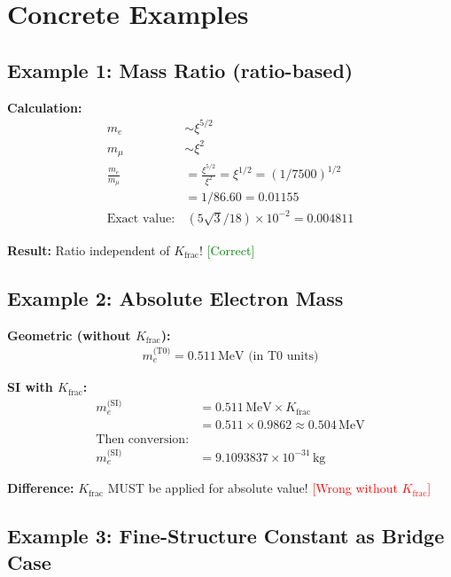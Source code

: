 	\section{Concrete Examples}
	
	\subsection{Example 1: Mass Ratio (ratio-based)}
	
	\textbf{Calculation:}
	\begin{align*}
		m_e &\sim \xi^{5/2} \\
		m_μ &\sim \xi^2 \\
		\frac{m_e}{m_μ} &= \frac{\xi^{5/2}}{\xi^2} = \xi^{1/2} = (1/7500)^{1/2} \\
		&= 1/86.60 = 0.01155 \\
		\text{Exact value:} &\, (5\sqrt{3}/18) \times 10^{-2} = 0.004811
	\end{align*}
	
	\textbf{Result:} Ratio independent of $K_{\text{frac}}$! \textcolor{green}{[Correct]}
	
	\subsection{Example 2: Absolute Electron Mass}
	
	\textbf{Geometric (without $K_{\text{frac}}$):}
	\begin{align*}
		m_e^{\text{(T0)}} = 0.511\,\text{MeV (in T0 units)}
	\end{align*}
	
	\textbf{SI with $K_{\text{frac}}$:}
	\begin{align*}
		m_e^{\text{(SI)}} &= 0.511\,\text{MeV} \times K_{\text{frac}} \\
		&= 0.511 \times 0.9862 \approx 0.504\,\text{MeV} \\
		\text{Then conversion:} & \\
		m_e^{\text{(SI)}} &= 9.1093837 \times 10^{-31}\,\text{kg}
	\end{align*}
	
	\textbf{Difference:} $K_{\text{frac}}$ MUST be applied for absolute value! \textcolor{red}{[Wrong without $K_{\text{frac}}$]}
	
	\subsection{Example 3: Fine-Structure Constant as Bridge Case}
	
